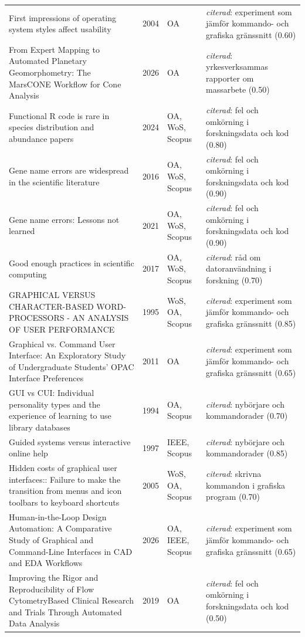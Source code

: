 \begin{longtable}{@{}%
  >{\raggedright\arraybackslash}p{}c%
  >{\raggedright\arraybackslash}p{}%
  >{\raggedright\arraybackslash}p{}@{}}
First impressions of operating system styles affect usability & 2004 & OA & \emph{citerad}: experiment som jämför kommando- och grafiska gränssnitt (0.60) \\
From Expert Mapping to Automated Planetary Geomorphometry: The MarsCONE Workflow for Cone Analysis & 2026 & OA & \emph{citerad}: yrkesverksammas rapporter om massarbete (0.50) \\
Functional R code is rare in species distribution and abundance papers & 2024 & OA, WoS, Scopus & \emph{citerad}: fel och omkörning i forskningsdata och kod (0.80) \\
Gene name errors are widespread in the scientific literature & 2016 & OA, WoS, Scopus & \emph{citerad}: fel och omkörning i forskningsdata och kod (0.90) \\
Gene name errors: Lessons not learned & 2021 & OA, WoS, Scopus & \emph{citerad}: fel och omkörning i forskningsdata och kod (0.90) \\
Good enough practices in scientific computing & 2017 & OA, WoS, Scopus & \emph{citerad}: råd om datoranvändning i forskning (0.70) \\
GRAPHICAL VERSUS CHARACTER-BASED WORD-PROCESSORS - AN ANALYSIS OF USER PERFORMANCE & 1995 & WoS, OA, Scopus & \emph{citerad}: experiment som jämför kommando- och grafiska gränssnitt (0.85) \\
Graphical vs. Command User Interface: An Exploratory Study of Undergraduate Students' OPAC Interface Preferences & 2011 & OA & \emph{citerad}: experiment som jämför kommando- och grafiska gränssnitt (0.65) \\
GUI vs CUI: Individual personality types and the experience of learning to use library databases & 1994 & OA, Scopus & \emph{citerad}: nybörjare och kommandorader (0.70) \\
Guided systems versus interactive online help & 1997 & IEEE, Scopus & \emph{citerad}: nybörjare och kommandorader (0.85) \\
Hidden costs of graphical user interfaces:: Failure to make the transition from menus and icon toolbars to keyboard shortcuts & 2005 & WoS, OA, Scopus & \emph{citerad}: skrivna kommandon i grafiska program (0.70) \\
Human-in-the-Loop Design Automation: A Comparative Study of Graphical and Command-Line Interfaces in CAD and EDA Workflows & 2026 & OA, IEEE, Scopus & \emph{citerad}: experiment som jämför kommando- och grafiska gränssnitt (0.65) \\
Improving the Rigor and Reproducibility of Flow CytometryBased Clinical Research and Trials Through Automated Data Analysis & 2019 & OA & \emph{citerad}: fel och omkörning i forskningsdata och kod (0.50) \\

\end{longtable}
